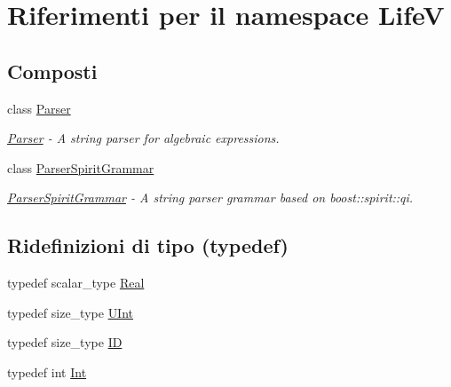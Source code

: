 \hypertarget{namespaceLifeV}{\section{Riferimenti per il namespace Life\-V}
\label{namespaceLifeV}
}
\subsection*{Composti}
\begin{DoxyCompactItemize}
\item 
class \hyperlink{classLifeV_1_1Parser}{Parser}
\begin{DoxyCompactList}\small\item\em \hyperlink{classLifeV_1_1Parser}{Parser} -\/ A string parser for algebraic expressions. \end{DoxyCompactList}\item 
class \hyperlink{classLifeV_1_1ParserSpiritGrammar}{Parser\-Spirit\-Grammar}
\begin{DoxyCompactList}\small\item\em \hyperlink{classLifeV_1_1ParserSpiritGrammar}{Parser\-Spirit\-Grammar} -\/ A string parser grammar based on {\ttfamily boost\-::spirit\-::qi}. \end{DoxyCompactList}\end{DoxyCompactItemize}
\subsection*{Ridefinizioni di tipo (typedef)}
\begin{DoxyCompactItemize}
\item 
typedef scalar\-\_\-type \hyperlink{namespaceLifeV_ad58c7402b26e5087b634b25d029c9c32}{Real}
\item 
typedef size\-\_\-type \hyperlink{namespaceLifeV_a4bd093cf6b0d5b57b2d89e0e90d610b7}{U\-Int}
\item 
typedef size\-\_\-type \hyperlink{namespaceLifeV_a7c0e64679fcd30daa5471b87a57601e9}{I\-D}
\item 
typedef int \hyperlink{namespaceLifeV_a86d39e8d98566ac745a6c441ed3de2dc}{Int}
\end{DoxyCompactItemize}
